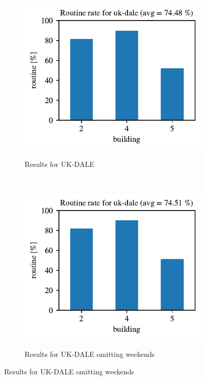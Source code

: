 \begin{figure}[H]
	\begin{subfigure}{.5\textwidth}
        \caption{Results for UK-DALE}
        \includegraphics[width=1\textwidth]{Figures/EC/ukdale_res.pdf}
        \label{fig:ukdale_res}
    \end{subfigure}
    ~
    \begin{subfigure}{.5\textwidth}
        \centering
        \caption{Results for UK-DALE omitting weekends}
        \includegraphics[width=1\textwidth]{Figures/EC/ukdale_nw_res.pdf}
        \label{fig:ukdale_res_nw}
    \end{subfigure}
\end{figure}



